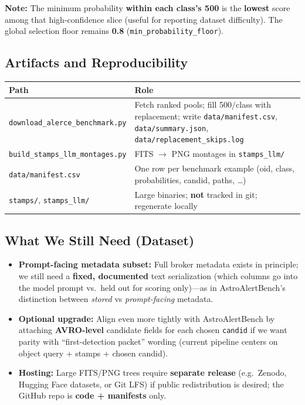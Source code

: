 \documentclass[11pt,a4paper]{article}
\begin{document}
\noindent\textbf{Note:} The minimum probability \textbf{within each class's 500} is the \textbf{lowest} score among that high-confidence slice (useful for reporting dataset difficulty). The global selection floor remains \textbf{0.8} (\texttt{min\_probability\_floor}).

\subsection{Artifacts and Reproducibility}

\begin{tabularx}{\textwidth}{@{}l X@{}}
\toprule
\textbf{Path} & \textbf{Role} \\
\midrule
\texttt{download\_alerce\_benchmark.py} & Fetch ranked pools; fill 500/class with replacement; write \texttt{data/manifest.csv}, \texttt{data/summary.json}, \texttt{data/replacement\_skips.log} \\
\texttt{build\_stamps\_llm\_montages.py} & FITS $\rightarrow$ PNG montages in \texttt{stamps\_llm/} \\
\texttt{data/manifest.csv} & One row per benchmark example (oid, class, probabilities, candid, paths, \ldots) \\
\texttt{stamps/}, \texttt{stamps\_llm/} & Large binaries; \textbf{not} tracked in git; regenerate locally \\
\bottomrule
\end{tabularx}

\subsection{What We Still Need (Dataset)}

\begin{itemize}[leftmargin=*]
  \item \textbf{Prompt-facing metadata subset:} Full broker metadata exists in principle; we still need a \textbf{fixed, documented} text serialization (which columns go into the model prompt vs.\ held out for scoring only)---as in AstroAlertBench's distinction between \textit{stored} vs \textit{prompt-facing} metadata.
  \item \textbf{Optional upgrade:} Align even more tightly with AstroAlertBench by attaching \textbf{AVRO-level} candidate fields for each chosen \texttt{candid} if we want parity with ``first-detection packet'' wording (current pipeline centers on object query + stamps + chosen candid).
  \item \textbf{Hosting:} Large FITS/PNG trees require \textbf{separate release} (e.g.\ Zenodo, Hugging Face datasets, or Git LFS) if public redistribution is desired; the GitHub repo is \textbf{code + manifests} only.
\end{itemize}
\end{document}
